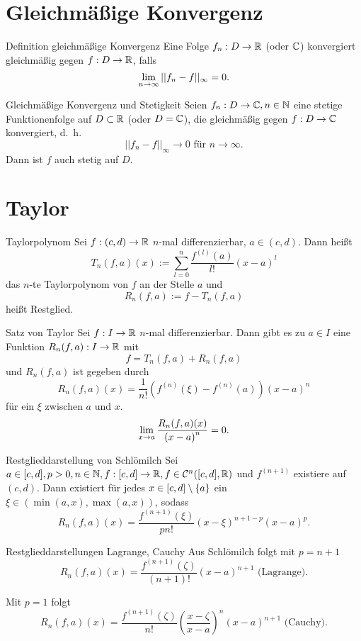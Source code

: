 \documentclass[main.tex]{subfiles}
\begin{document}
\section*{Gleichmäßige Konvergenz}

\begin{karte}{Definition gleichmäßige Konvergenz}
    Eine Folge \( f_n : D \rightarrow \mathbb{R} \) (oder \( \mathbb{C} \)) 
    konvergiert gleichmäßig gegen \( f: D \rightarrow \mathbb{R} \), 
    falls 
    \[ \lim\limits_{n\rightarrow\infty} ||f_n - f ||_\infty = 0. \]
\end{karte}
\begin{karte}{Gleichmäßige Konvergenz und Stetigkeit}
    Seien \( f_n : D \rightarrow \mathbb{C}, n\in\mathbb{N} \) eine 
    stetige Funktionenfolge auf \( D \subset \mathbb{R} \) 
    (oder \( D = \mathbb{C} \)), die gleichmäßig gegen 
    \( f: D \rightarrow \mathbb{C} \) konvergiert, d.\ h.\ 
    \[ ||f_n - f||_\infty \rightarrow 0 
    \text{ für } n\rightarrow\infty. \]
    Dann ist \(f\) auch stetig auf \(D\).
\end{karte}

\section*{Taylor}

\begin{karte}{Taylorpolynom}
    Sei \( f : (c,d) \rightarrow \mathbb{R} \) \(n\)-mal differenzierbar, 
    \( a \in (c,d) \). Dann heißt 
    \[ T_n(f,a)(x) := \sum_{l=0}^n 
    \frac{f^{(l)}(a)}{l!} {(x-a)}^l \]
    das \(n\)-te Taylorpolynom von \(f\) an der Stelle \(a\) 
    und \[ R_n(f,a) := f - T_n(f,a) \] heißt Restglied.
\end{karte}

\begin{karte}{Satz von Taylor}
    Sei \( f : I \rightarrow \mathbb{R} \) \( n \)-mal differenzierbar. Dann gibt es zu
    \( a \in I \) eine Funktion \( R_n(f,a) : I \rightarrow \mathbb{R} \) mit
    \[ f = T_n(f, a) + R_n(f,a) \]
    und \( R_n(f,a) \) ist gegeben durch
    \[ R_n(f,a)(x) = \frac{1}{n!} 
    \left( f^{(n)}(\xi) - f^{(n)}(a) \right) {(x-a)}^n \]
    für ein \( \xi \) zwischen \( a \) und \( x \).
    \[ \lim\limits_{x\rightarrow a} \frac{ R_n(f,a)(x) }{ {(x-a)}^n } = 0. \]
\end{karte}

\begin{karte}{Restglieddarstellung von Schlömilch}
    Sei \( a \in [c,d], p > 0, n \in \mathbb{N}, 
    f : [c,d] \rightarrow \mathbb{R}, f\in \mathcal{C}^n([c, d], \mathbb{R}) \) 
    und \( f^{(n+1)} \) existiere auf \( (c,d) \). Dann existiert 
    für jedes \( x \in [c,d]\setminus \{a\} \) ein \( \xi
    \in (\min(a,x), \max(a,x)) \), sodass 
    \[ R_n(f,a)(x) = \frac{f^{(n+1)}(\xi)}{ pn! } 
    (x - \xi)^{n+1-p} (x-a)^p. \]
\end{karte}

\begin{karte}{Restglieddarstellungen Lagrange, Cauchy}
    Aus Schlömilch folgt mit \( p=n+1 \)
    \[ R_n(f,a)(x) = \frac{f^{(n+1)}(\zeta)}{(n+1)!} (x-a)^{n+1} \text{ (Lagrange)}. \]
    
    Mit \( p = 1 \) folgt
    \[ R_n(f,a)(x) = \frac{f^{(n+1)}(\zeta)}{n!} 
    \left( \frac{x- \zeta}{x-a} \right)^n (x-a)^{n+1} \text{ (Cauchy)}. \]
\end{karte}
\end{document}
